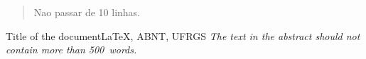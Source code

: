 \begin{abstract}
Nao passar de 10 linhas.
\end{abstract}

\begin{englishabstract}{Title of the document}{\LaTeX, ABNT, UFRGS }
\emph{The text in the abstract should not contain more than 500~words.}
\end{englishabstract}
